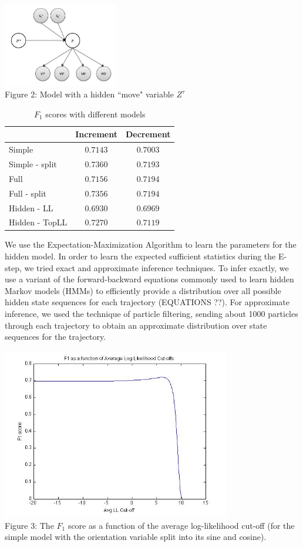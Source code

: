 \documentclass{article} %
\begin{document}
\includegraphics[width=5cm]{hidden.jpg}\\
\small{Figure 2: Model with a hidden ``move" variable $Z^\tau$}

\begin{table}[htdp]
\caption{$F_1$ scores with different models}
\begin{center}
\begin{tabular}{l|c|c|}
 & Increment & Decrement \\ \hline
 Simple & $0.7143$ & $0.7003$ \\
 Simple - split & $0.7360$ & $ 0.7193$ \\
 Full & $0.7156$ & $0.7194$ \\
 Full - split & $0.7356$ & $0.7194$ \\
 Hidden - LL & $0.6930$ & $0.6969$ \\
 Hidden - TopLL & $0.7270$ & $0.7119$
\end{tabular}
\end{center}
\end{table}

\normalsize
We use the Expectation-Maximization Algorithm to learn the parameters for the hidden model. In order to learn the expected sufficient statistics during the E-step, we tried exact and approximate inference techniques. To infer exactly, we use a variant of the forward-backward equations commonly used to learn hidden Markov models (HMMs) to efficiently provide a distribution over all possible hidden state sequences for each trajectory (EQUATIONS ??). For approximate inference, we used the technique of particle filtering, sending about 1000 particles through each trajectory to obtain an approximate distribution over state sequences for the trajectory.

\includegraphics[width=10cm]{simple-sincos-llf1.jpg}\\
\small{Figure 3: The $F_1$ score as a function of the average log-likelihood cut-off (for the simple model with the orientation variable split into its sine and cosine).}
\end{document}
